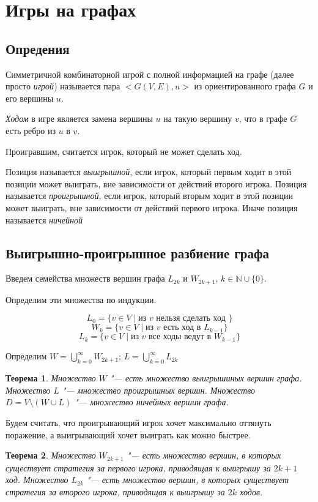 \documentclass[12pt,a4paper]{article}
\newcommand{\N}{\mathbb{N}}
\theoremstyle{plain}
\newtheorem{thm}{Теорема}
\begin{document}
\section{Игры на графах}
\subsection{Опредения}
Симметричной комбинаторной игрой с полной информацией на графе (далее просто \emph{игрой}) называется пара $<G(V, E), u>$ из ориентированного графа $G$ и его вершины $u$.

\emph{Ходом} в игре является замена вершины $u$ на такую вершину $v$, что в графе $G$ есть ребро из $u$ в $v$.

Проигравшим, считается игрок, который не может сделать ход.

Позиция называется \emph{выигрышной}, если игрок, который первым ходит в этой позиции может выиграть, вне зависимости от действий второго игрока.
Позиция называется \emph{проигрышной}, если игрок, который вторым ходит в этой позиции может выиграть, вне зависимости от действий первого игрока.
Иначе позиция называется \emph{ничейной}

\subsection{Выигрышно-проигрышное разбиение графа}

Введем семейства множеств вершин графа $L_{2k}$ и $W_{2k+1}$, $k \in \N\cup\{0\}$.

Определим эти множества по индукции.

$$L_0 = \{v \in V \mid \text{из }v \text{ нельзя сделать ход }\}$$
$$W_k = \{v \in V \mid \text{из }v \text{ есть ход в } L_{k-1}\}$$
$$L_k = \{v \in V \mid \text{из }v \text{ все ходы ведут в } W_{k-1}\}$$

Определим $W = \bigcup\limits_{k=0}^{\infty}{W_{2k+1}}$; $L = \bigcup\limits_{k=0}^{\infty}{L_{2k}}$

\begin{thm}
Множество $W$ "--- есть множество выигрышиных вершин графа.
Множество $L$ "--- множество проигрышных вершин.
Множество $D = V \setminus (W \cup L)$ "--- множество ничейных вершин графа.
\end{thm}

Будем считать, что проигрывающий игрок хочет максимально оттянуть поражение, а выигрывающий хочет выиграть как можно быстрее.

\begin{thm}
Множество $W_{2k+1}$ "--- есть множество вершин, в которых существует стратегия за первого игрока, приводящая к выигрышу за $2k+1$ ход.
Множество $L_{2k}$ "--- есть множество вершин, в которых существует стратегия за второго игрока, приводящая к выигрышу за $2k$ ходов.
\end{thm}
\end{document}
